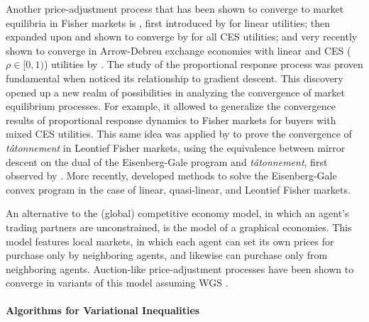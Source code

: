 Another price-adjustment process that has been shown to converge to market equilibria in Fisher markets is , first introduced by \citet{first-prop-response} for linear utilities; then expanded upon and shown to converge by \cite{proportional-response} for all CES utilities; and very recently shown to converge in Arrow-Debreu exchange economies with linear and CES ($\rho \in [0,1)$) utilities by \citeauthor{branzei2021proportional}. 
The study of the proportional response process was proven fundamental when \citeauthor{fisher-tatonnement} noticed its relationship to gradient descent.
This discovery opened up a new realm of possibilities in analyzing the convergence of market equilibrium processes.
For example, it allowed \citet{cheung2018dynamics} to generalize the convergence results of proportional response dynamics to Fisher markets for buyers with mixed CES utilities.
This same idea was applied by \citet{fisher-tatonnement} to prove the convergence of \emph{t\^atonnement\/} in Leontief Fisher markets, using the equivalence between mirror descent \cite{boyd2004convex}
on the dual of the Eisenberg-Gale program 
and \emph{t\^atonnement}, first observed by \citet{devanur2008market}.
More recently, \citet{gao2020first} developed 
methods to solve the Eisenberg-Gale convex program in the case of linear, quasi-linear, and Leontief Fisher markets.

An alternative to the (global) competitive economy model, in which an agent's trading partners are unconstrained, is the \citet{kakade2004graphical} model of a graphical economies.
This model features local markets, in which each agent can set its own prices for purchase only by neighboring agents, and likewise can purchase only from neighboring agents. 
Auction-like price-adjustment processes have been shown to converge in variants of this model assuming WGS \cite{andrade2021graphical}.

\paragraph{Algorithms for Variational Inequalities}

